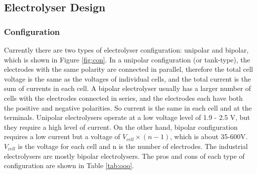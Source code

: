 

\subsection{Electrolyser Design} 


\subsubsection{Configuration} 
Currently there are two types of electrolyser configuration: unipolar and bipolar, which is shown in Figure \ref{fig:con}. In a unipolar configuration (or tank-type), the electrodes with the same polarity are connected in parallel, therefore the total cell voltage is the same as the voltages of individual cells, and the total current is the sum of currents in each cell. A bipolar electrolyser usually has a larger number of cells with the electrodes connected in series, and the electrodes each have both the positive and negative polarities. So current is the same in each cell and at the terminals. Unipolar electrolysers operate at a low voltage level of 1.9 - 2.5 V,\cite{configuration} but they require a high level of current. On the other hand, bipolar configuration requires a low current but a voltage of $V_{cell} \times (n-1)$, which is about 35-600V.\cite{configuration} $V_{cell}$ is the voltage for each cell and n is the number of electrodes. The industrial electrolysers are mostly bipolar electrolysers.
The pros and cons of each type of configuration are shown in Table \ref{tab:ooo}.

